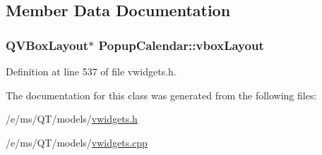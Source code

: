 \subsection{Member Data Documentation}
\hypertarget{classPopupCalendar_a91fe62eeacad0afcee4da61b5c711604}{
\subsubsection[{vboxLayout}]{\setlength{\rightskip}{0pt plus 5cm}QVBoxLayout$\ast$ {\bf PopupCalendar::vboxLayout}}}
\label{classPopupCalendar_a91fe62eeacad0afcee4da61b5c711604}


Definition at line 537 of file vwidgets.h.



The documentation for this class was generated from the following files:\begin{DoxyCompactItemize}
\item 
/e/ms/QT/models/\hyperlink{vwidgets_8h}{vwidgets.h}\item 
/e/ms/QT/models/\hyperlink{vwidgets_8cpp}{vwidgets.cpp}\end{DoxyCompactItemize}
